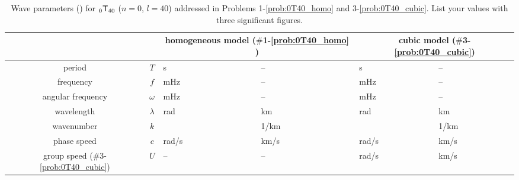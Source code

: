 \documentclass[11pt,titlepage,fleqn]{article}
\begin{document}
\begin{table}
\caption[]
{{
Wave parameters () for $_0\mbox{${\sf T}$}_{40}$ ($n=0$, $l=40$) addressed in Problems 1-\ref{prob:0T40_homo} and 3-\ref{prob:0T40_cubic}. List your values with three significant figures.
\label{tab:eigfun}
}}
\begin{spacing}{1.5}
\hspace{-1.0cm}
\begin{tabular}{||c|c|l|l||l|l||}
\hline
& & \multicolumn{2}{c||}{homogeneous model ($\#$1-\ref{prob:0T40_homo} )} & \multicolumn{2}{c||}{cubic model ($\#$3-\ref{prob:0T40_cubic})}  \\ \hline\hline
period & $T$ & \hspace{2cm}s & -- & \hspace{2cm}s & -- \\  \hline
frequency & $f$ & \hspace{2cm}mHz & -- & \hspace{2cm}mHz & -- \\  \hline
angular frequency & $\omega$ & \hspace{2cm}mHz & --  & \hspace{2cm}mHz & -- \\  \hline
wavelength & $\lambda$ & \hspace{2cm}rad & \hspace{2cm}km & \hspace{2cm}rad & \hspace{2cm}km \\  \hline
wavenumber & $k$ & \hspace{2cm} & \hspace{2cm}1/km & \hspace{2cm} & \hspace{2cm}1/km \\  \hline
phase speed & $c$ & \hspace{2cm}rad/s & \hspace{2cm}km/s & \hspace{2cm}rad/s & \hspace{2cm}km/s \\  \hline\hline
group speed ($\#$3-\ref{prob:0T40_cubic}) & $U$ & -- & -- & \hspace{2cm}rad/s & \hspace{2cm}km/s \\  \hline
\hline
\end{tabular}
\end{spacing}
\end{table}
\end{document}

